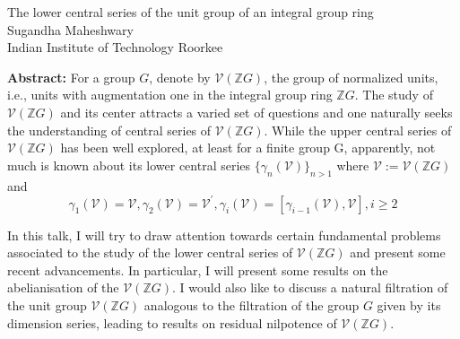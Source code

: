 \documentclass[12pt,a4paper]{article}
\begin{document}
\thispagestyle{empty} 
\begin{center}
{\large The lower central series of the unit group of an integral group ring}\\
\vspace*{.5cm}
Sugandha Maheshwary\\
Indian Institute of Technology Roorkee\\
\end{center}
\vspace*{.8cm}

{\bf Abstract:} For a group $G$, denote by $\mathcal{V}(\mathbb{Z} G)$, the group of normalized units, i.e., units with augmentation one in the integral group ring $\mathbb{Z} G$. The study of $\mathcal{V}(\mathbb{Z} G)$ and its center attracts a varied set of questions and one naturally seeks the understanding of central series of $\mathcal{V}(\mathbb{Z} G)$. While the upper central series of $\mathcal{V}(\mathbb{Z} G)$ has been well explored, at least for a finite group G, apparently, not much is known about its lower central series $\{ \gamma_n(\mathcal{V}) \}_{n > 1}$ where $\mathcal{V} := \mathcal{V}(\mathbb{Z}G)$ and 
$$
\gamma_{1}(\mathcal{V})=\mathcal{V}, \gamma_{2}(\mathcal{V})=\mathcal{V}^{\prime}, \gamma_{i}(\mathcal{V})=\left[\gamma_{i-1}(\mathcal{V}), \mathcal{V}\right], i \geq 2$$

In this talk, I will try to draw attention towards certain fundamental problems associated to the study of the lower central series of $\mathcal{V}(\mathbb{Z} G)$ and present some recent advancements. In particular, I will present some results on the abelianisation of the $\mathcal{V}(\mathbb{Z} G)$. I would also like to discuss a natural filtration of the unit group $\mathcal{V}(\mathbb{Z} G)$ analogous to the filtration of the group $G$ given by its dimension series, leading to results on residual nilpotence of $\mathcal{V}(\mathbb{Z} G)$.		
\end{document}
